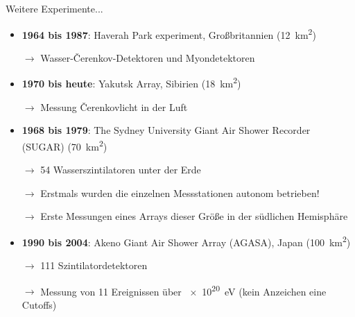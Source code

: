 \documentclass[aspectratio=1610, professionalfonts, 9pt, hyperref={colorlinks=false}]{beamer}
\begin{document}
\begin{frame}{Weitere Experimente...}
      \begin{itemize}
        \setlength\itemsep{0.5em}
        \item \textbf{1964 bis 1987}: Haverah Park experiment, Großbritannien (\SI{12}{\kilo\metre\squared})
        \item[$\rightarrow$] Wasser-Čerenkov-Detektoren und Myondetektoren
        \item \textbf{1970 bis heute}: Yakutsk Array, Sibirien (\SI{18}{\kilo\metre\squared})
        \item[$\rightarrow$] Messung Čerenkovlicht in der Luft
        \item \textbf{1968 bis 1979}: The Sydney University Giant Air Shower Recorder (SUGAR) (\SI{70}{\kilo\metre\squared})
        \item[$\rightarrow$] 54 Wasserszintilatoren unter der Erde
        \item[$\rightarrow$] Erstmals wurden die einzelnen Messstationen autonom betrieben!
        \item[$\rightarrow$] Erste Messungen eines Arrays dieser Größe in der südlichen Hemisphäre
        \item \textbf{1990 bis 2004}: Akeno Giant Air Shower Array (AGASA), Japan (\SI{100}{\kilo\metre\squared})
        \item[$\rightarrow$] 111 Szintilatordetektoren
        \item[$\rightarrow$] Messung von 11 Ereignissen über \SI{e20}{\electronvolt} (kein Anzeichen eine Cutoffs)


      \end{itemize}
\end{frame}
\end{document}

